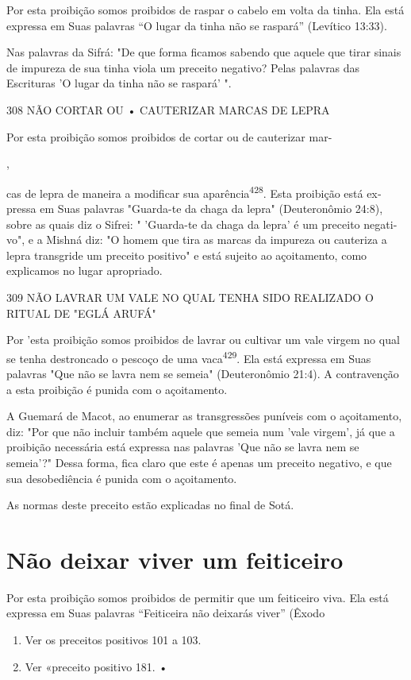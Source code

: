 Por esta proibição somos proibidos de raspar o cabelo em volta da tinha.
Ela está expressa em Suas palavras ``O lugar da tinha não se raspará''
(Le­vítico 13:33).

Nas palavras da Sifrá: "De que forma ficamos sabendo que aquele que
tirar sinais de impureza de sua tinha viola um preceito negativo? Pelas
pala­vras das Escrituras 'O lugar da tinha não se raspará' ".

308 NÃO CORTAR OU • CAUTERIZAR MARCAS DE LEPRA


Por esta proibição somos proibidos de cortar ou de cauterizar mar-


,

cas de lepra de maneira a modificar sua aparência\textsuperscript{428}.
Esta proibição está ex­pressa em Suas palavras "Guarda-te da chaga da
lepra" (Deuteronômio 24:8), sobre as quais diz o Sifrei: " 'Guarda-te da
chaga da lepra' é um preceito negati­vo", e a Mishná diz: "O homem que
tira as marcas da impureza ou cauteriza a lepra transgride um preceito
positivo" e está sujeito ao açoitamento, como explicamos no lugar
apropriado.

309 NÃO LAVRAR UM VALE NO QUAL TENHA SIDO REALIZADO O RITUAL DE "EGLÁ
ARUFÁ"

Por 'esta proibição somos proibidos de lavrar ou cultivar um vale
vir­gem no qual se tenha destroncado o pescoço de uma
vaca\textsuperscript{429}. Ela está expres­sa em Suas palavras "Que não
se lavra nem se semeia" (Deuteronômio 21:4). A contravenção a esta
proibição é punida com o açoitamento.

A Guemará de Macot, ao enumerar as transgressões puníveis com o
açoitamento, diz: "Por que não incluir também aquele que semeia num
'vale virgem', já que a proibição necessária está expressa nas palavras
'Que não se lavra nem se semeia'?" Dessa forma, fica claro que este é
apenas um preceito negativo, e que sua desobediência é punida com o
açoitamento.

As normas deste preceito estão explicadas no final de Sotá.

\section{Não deixar viver um feiticeiro}

Por esta proibição somos proibidos de permitir que um feiticeiro vi­va.
Ela está expressa em Suas palavras ``Feiticeira não deixarás viver''
(Êxodo


\begin{enumerate}
\def\labelenumi{\arabic{enumi}.}
\setcounter{enumi}{427}
\item
 
 Ver os preceitos positivos 101 a 103.
 
\item
 
 Ver «preceito positivo 181. •
 
\end{enumerate}




